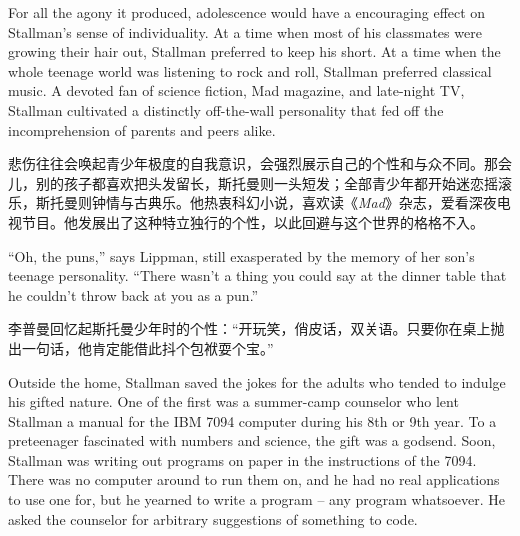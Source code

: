 \ifdefined\eng
For all the agony it produced, adolescence would have a encouraging effect on Stallman's sense of individuality. At a time when most of his classmates were growing their hair out, Stallman preferred to keep his short. At a time when the whole teenage world was listening to rock and roll, Stallman preferred classical music. A devoted fan of science fiction, Mad magazine, and late-night TV, Stallman cultivated a distinctly off-the-wall personality that fed off the incomprehension of parents and peers alike.
\fi

\ifdefined\chs
悲伤往往会唤起青少年极度的自我意识，会强烈展示自己的个性和与众不同。那会儿，别的孩子都喜欢把头发留长，斯托曼则一头短发；全部青少年都开始迷恋摇滚乐，斯托曼则钟情与古典乐。他热衷科幻小说，喜欢读《\textit{Mad}》杂志，爱看深夜电视节目。他发展出了这种特立独行的个性，以此回避与这个世界的格格不入。
\fi

\ifdefined\eng
``Oh, the puns,'' says Lippman, still exasperated by the memory of her son's teenage personality. ``There wasn't a thing you could say at the dinner table that he couldn't throw back at you as a pun.''
\fi

\ifdefined\chs
李普曼回忆起斯托曼少年时的个性：``开玩笑，俏皮话，双关语。只要你在桌上抛出一句话，他肯定能借此抖个包袱耍个宝。''
\fi

\ifdefined\eng
Outside the home, Stallman saved the jokes for the adults who tended to indulge his gifted nature. One of the first was a summer-camp counselor who lent Stallman a manual for the IBM 7094 computer during his 8th or 9th year. To a preteenager fascinated with numbers and science, the gift was a godsend. Soon, Stallman was writing out programs on paper in the instructions of the 7094.  There was no computer around to run them on, and he had no real applications to use one for, but he yearned to write a program -- any program whatsoever.  He asked the counselor for arbitrary suggestions of something to code.
\fi

